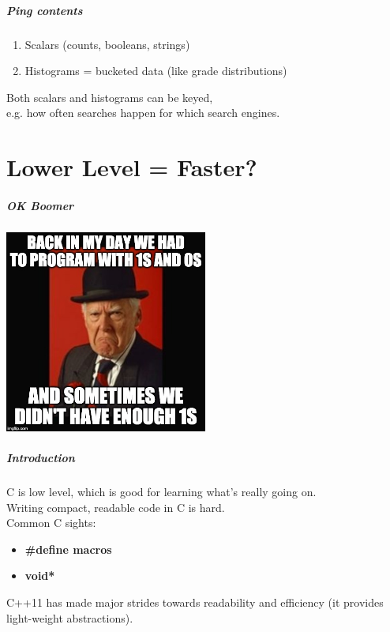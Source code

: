 \begin{frame}
\frametitle{Ping contents}
\Large

\begin{enumerate}
\item Scalars (counts, booleans, strings)
\item Histograms = bucketed data (like grade distributions)
\end{enumerate}

Both scalars and histograms can be keyed, \\
e.g. how often searches happen for which search engines.
\end{frame}

\part{Lower Level = Faster?}

\begin{frame}
\partpage
\end{frame}


\begin{frame}
\frametitle{OK Boomer}

\begin{center}
	\includegraphics[width=0.5\textwidth]{images/grumpyman.jpg}
\end{center}


\end{frame}


\begin{frame}
  \frametitle{Introduction}

  
       C is low level, which is good for learning what's
    really going on.\\[2em]

    Writing compact, readable code in C is hard. \\ Common C sights:
      \begin{itemize}
        \item {\bf \#define macros}
        \item {\bf void*}
      \end{itemize}
    C++11 has made major strides towards readability and efficiency
      (it provides light-weight abstractions).
  
\end{frame}


